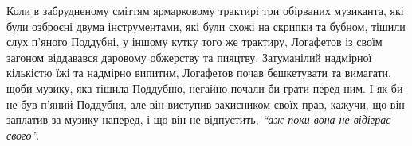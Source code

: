 \documentclass[a4paper,20pt]{report}
\begin{document}
Коли в забрудненому сміттям ярмарковому трактирі три обірваних музиканта, які
були озброєні двума інструментами, які були схожі на скрипки та бубном, тішили
слух п'яного Поддубні, у іншому кутку того же трактиру, Логафетов із своїм
загоном віддавався даровому обжерству та пияцтву. Затуманілий надмірної
кількістю їжі та надмірно випитим, Логафетов почав бешкетувати та вимагати,
щоби музику, яка тішила Поддубню, негайно почали би грати перед ним. І як би не
був п'яний Поддубня, але він виступив захисником своїх прав, кажучи, що він
заплатив за музику наперед, і що він не відпустить, \emph{``аж поки вона не відіграє
свого''.}

\end{document}
